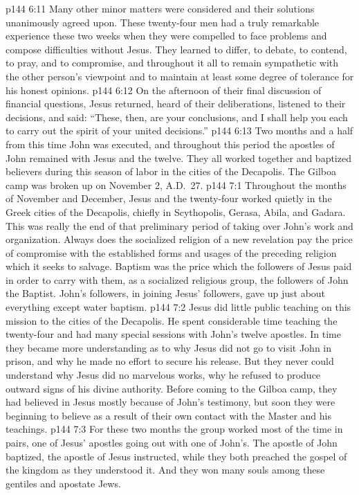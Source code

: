 \vs p144 6:11 Many other minor matters were considered and their solutions unanimously agreed upon. These twenty\hyp{}four men had a truly remarkable experience these two weeks when they were compelled to face problems and compose difficulties without Jesus. They learned to differ, to debate, to contend, to pray, and to compromise, and throughout it all to remain sympathetic with the other person’s viewpoint and to maintain at least some degree of tolerance for his honest opinions.
\pc \vs p144 6:12 On the afternoon of their final discussion of financial questions, Jesus returned, heard of their deliberations, listened to their decisions, and said: \textcolor{ubdarkred}{“These, then, are your conclusions, and I shall help you each to carry out the spirit of your united decisions.”}
\pc \vs p144 6:13 Two months and a half from this time John was executed, and throughout this period the apostles of John remained with Jesus and the twelve. They all worked together and baptized believers during this season of labor in the cities of the Decapolis. The Gilboa camp was broken up on November 2, A.D.~27.
\vs p144 7:1 Throughout the months of November and December, Jesus and the twenty\hyp{}four worked quietly in the Greek cities of the Decapolis, chiefly in Scythopolis, Gerasa, Abila, and Gadara. This was really the end of that preliminary period of taking over John’s work and organization. Always does the socialized religion of a new revelation pay the price of compromise with the established forms and usages of the preceding religion which it seeks to salvage. Baptism was the price which the followers of Jesus paid in order to carry with them, as a socialized religious group, the followers of John the Baptist. John’s followers, in joining Jesus’ followers, gave up just about everything except water baptism.
\vs p144 7:2 Jesus did little public teaching on this mission to the cities of the Decapolis. He spent considerable time teaching the twenty\hyp{}four and had many special sessions with John’s twelve apostles. In time they became more understanding as to why Jesus did not go to visit John in prison, and why he made no effort to secure his release. But they never could understand why Jesus did no marvelous works, why he refused to produce outward signs of his divine authority. Before coming to the Gilboa camp, they had believed in Jesus mostly because of John’s testimony, but soon they were beginning to believe as a result of their own contact with the Master and his teachings.
\vs p144 7:3 For these two months the group worked most of the time in pairs, one of Jesus’ apostles going out with one of John’s. The apostle of John baptized, the apostle of Jesus instructed, while they both preached the gospel of the kingdom as they understood it. And they won many souls among these gentiles and apostate Jews.\plusone
